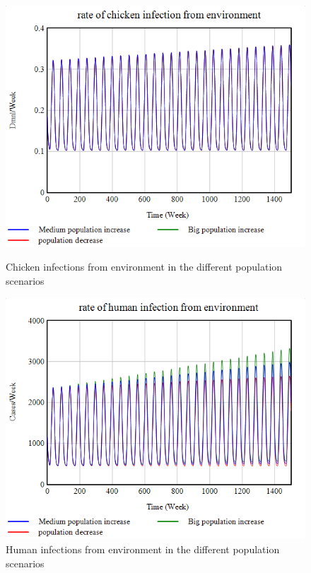 \begin{figure}[h!]
    \centering
    \begin{minipage}{0.45\textwidth}
        \centering
        \includegraphics[width=1\textwidth]{images/sensitivity/Population chicken infection.png} 
        \caption{Chicken infections from environment in the different population scenarios}
        \label{fig:pop_chicken}
    \end{minipage}\hfill
    \begin{minipage}{0.45\textwidth}
        \centering
        \includegraphics[width=1\textwidth]{images/sensitivity/Population human infection.png}
        \caption{Human infections from environment in the different population scenarios}
        \label{fig:pop_human}
    \end{minipage}
\end{figure}

